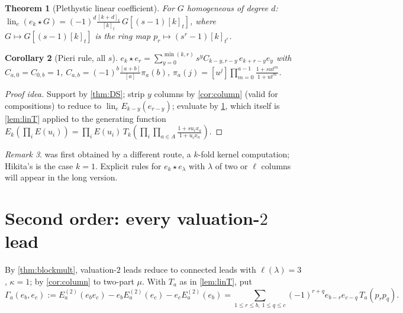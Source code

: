 \documentclass[submission]{FPSAC2027}
\newtheorem{theorem}{Theorem}[section]
\newtheorem{corollary}[theorem]{Corollary}
\theoremstyle{definition}
\theoremstyle{remark}
\newtheorem{remark}[theorem]{Remark}
\newcommand{\lin}{\operatorname{lin}_e}
\begin{document}
\begin{theorem}[Plethystic linear coefficient]\label{thm:lin}
For $G$ homogeneous of degree $d$: $\lin(e_k\star G)=(-1)^d\frac{[k+d]_t}{[k]_t}\,G[(s-1)[k]_t]$, where $G\mapsto G[(s-1)[k]_t]$ is the ring map $p_r\mapsto(s^r-1)[k]_{t^r}$.
\end{theorem}
\begin{corollary}[Pieri rule, all $s$]\label{cor:pieri}
$e_k\star e_r=\sum_{y=0}^{\min(k,r)}s^yC_{k-y,r-y}\,e_{k+r-y}e_y$ with $C_{a,0}=C_{0,b}=1$, $C_{a,b}=(-1)^b\frac{[a+b]}{[a]}\pi_a(b)$, $\pi_a(j)=[u^j]\prod_{m=0}^{a-1}\frac{1+sut^m}{1+ut^m}$.
\end{corollary}
\begin{proof}[Proof idea]
Support by \cref{thm:DS}; strip $y$ columns by \cref{cor:column} (valid for compositions) to reduce to $\lin E_{k-y}(e_{r-y})$; evaluate by \cref{thm:lin}, which itself is \cref{lem:linT} applied to the generating function $E_k(\prod_iE(u_i))=\prod_iE(u_i)\,T_k(\prod_i\prod_{a\in A}\frac{1+su_ix_a}{1+u_ix_a})$.
\end{proof}
\begin{remark}
 was first obtained by a different route, a $k$-fold kernel computation; Hikita's \cite[Thm.~3.12]{Hikita25} is the case $k=1$. Explicit rules for $e_k\star e_\lambda$ with $\lambda$ of two or $\ell$ columns will appear in the long version.
\end{remark}

\section{Second order: every valuation-$2$ lead}\label{sec:v2}

By \cref{thm:blockmult}, valuation-$2$ leads reduce to connected leads with $\ell(\lambda)=3$, $\kappa=1$; by \cref{cor:column} to two-part $\mu$. With $T_a$ as in \cref{lem:linT}, put
\[ \Gamma_a(e_b,e_c):=E_a^{(2)}(e_be_c)-e_bE_a^{(2)}(e_c)-e_cE_a^{(2)}(e_b)=\sum_{1\le r\le b,\ 1\le q\le c}(-1)^{r+q}e_{b-r}e_{c-q}\,T_a(p_rp_q). \]
\end{document}
